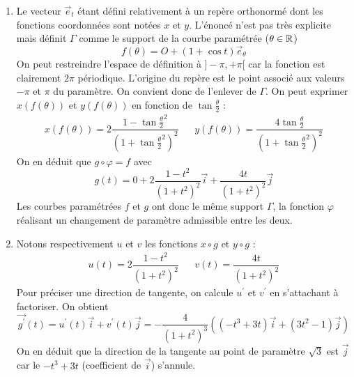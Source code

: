 \begin{enumerate}
 \item Le vecteur $\overrightarrow{e}_t$ étant défini relativement à un repère orthonormé dont les fonctions coordonnées sont notées $x$ et $y$. L'énoncé n'est pas très explicite mais définit $\Gamma$ comme le support de la courbe paramétrée ($\theta \in \mathbb{R}$)
\begin{displaymath}
 f(\theta) = O + (1+\cos t)\overrightarrow{e}_\theta
\end{displaymath}
On peut restreindre l'espace de définition à $]-\pi , +\pi [$ car la fonction est clairement $2\pi$ périodique. L'origine du repère est le point associé aux valeurs $-\pi$ et $\pi$ du paramètre. On convient donc de l'enlever de $\Gamma$.\newline
 On peut exprimer $x(f(\theta))$ et $y(f(\theta))$ en fonction de $\tan\frac{\theta}{2}$ :
\begin{align*}
 x(f(\theta)) = 2\dfrac{1-\tan\frac{\theta}{2}^2}{(1+\tan\frac{\theta}{2}^2)^2} & & 
 y(f(\theta)) = \dfrac{4\tan\frac{\theta}{2}}{(1+\tan\frac{\theta}{2}^2)^2}
\end{align*}
On en déduit que $g\circ \varphi = f$ avec
\begin{displaymath}
 g(t) = 0 + 2\dfrac{1-t^2}{(1+t^2)^2}\overrightarrow i + \dfrac{4t}{(1+t^2)^2}\overrightarrow j
\end{displaymath}
Les courbes paramétrées $f$ et $g$ ont donc le même support $\Gamma$, la fonction $\varphi$ réalisant un changement de paramètre admissible entre les deux.
\item Notons respectivement $u$ et $v$ les fonctions $x\circ g$ et $y\circ g$ :
\begin{align*}
 u(t) = 2\dfrac{1-t^2}{(1+t^2)^2} & & v(t) = \dfrac{4t}{(1+t^2)^2}
\end{align*}
Pour préciser une direction de tangente, on calcule $u^\prime$ et $v^\prime$ en s'attachant à factoriser. On obtient
\begin{displaymath}
 \overrightarrow{g^\prime}(t) = u^\prime(t)\overrightarrow i +v^\prime(t)\overrightarrow j
= -\dfrac{4}{(1+t^2)^3}\left( (-t^3+3t)\overrightarrow i +(3t^2-1)\overrightarrow j\right)  
\end{displaymath}
On en déduit que la direction de la tangente au point de paramètre $\sqrt{3}$ est $\overrightarrow j$ car le $-t^3+3t$ (coefficient de $\overrightarrow i$) s'annule.


\end{enumerate}
